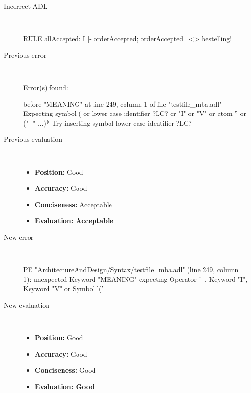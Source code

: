 \hrulefill

\begin{description}
  \item[Incorrect ADL]~\\
\begin{adl}
RULE allAccepted: I |- orderAccepted; orderAccepted~ <> bestelling!\end{adl}
  \item[Previous error]~\\
\begin{haskell}
Error(s) found:

before "MEANING" at line 249, column 1 of file "testfile_mba.adl"
Expecting symbol ( or lower case identifier ?LC? or "I" or "V" or atom '' or ("-
" ...)*
Try inserting symbol lower case identifier ?LC?\end{haskell}
  \item[Previous evaluation]~\\
    \begin{itemize}
    \item \textbf{Position:} Good
    \item \textbf{Accuracy:} Good
    \item \textbf{Conciseness:} Acceptable
    \item \textbf{Evaluation: Acceptable}
    \end{itemize}
  \item[New error]~\\
\begin{haskell}
PE "ArchitectureAndDesign/Syntax/testfile_mba.adl" (line 249, column 1):
unexpected Keyword "MEANING"
expecting Operator '-', Keyword "I", Keyword "V" or Symbol '('
\end{haskell}
  \item[New evaluation]~\\
    \begin{itemize}
    \item \textbf{Position:} Good
    \item \textbf{Accuracy:} Good
    \item \textbf{Conciseness:} Good
    \item \textbf{Evaluation: Good}
    \end{itemize}
  \end{description}

\hrulefill

